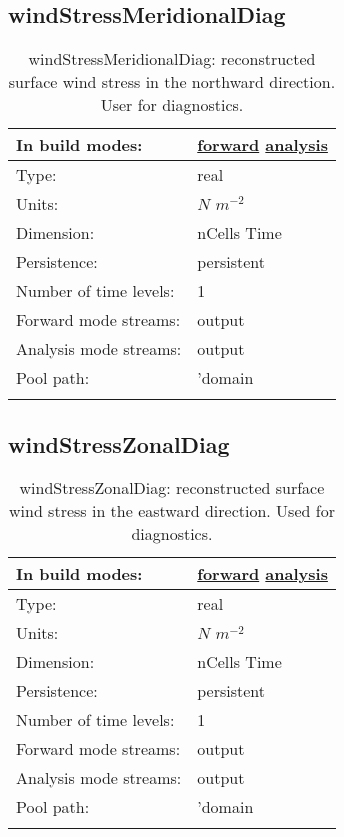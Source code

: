 \subsection[windStressMeridionalDiag]{windStressMeridionalDiag}
\label{subsec:var_sec_diagnostics_windStressMeridionalDiag}
\begin{center}
\begin{longtable}{| p{2.0in} | p{4.0in} |}
        \hline 
        In build modes: & \hyperref[subsec:forward_var_tab_diagnostics]{forward} \hyperref[subsec:analysis_var_tab_diagnostics]{analysis} \\
        \hline 
        Type: & real \\
        \hline 
        Units: & $N$ $m^{-2}$ \\
        \hline 
        Dimension: & nCells Time \\
        \hline 
        Persistence: & persistent \\
        \hline 
        Number of time levels: & 1 \\
        \hline 
		 Forward mode streams: &  output \\
        \hline 
		 Analysis mode streams: &  output \\
        \hline 
            Pool path: & 'domain %
 \\
		 \hline 
    \caption{windStressMeridionalDiag: reconstructed surface wind stress in the northward direction. User for diagnostics.}
\end{longtable}
\end{center}
\subsection[windStressZonalDiag]{windStressZonalDiag}
\label{subsec:var_sec_diagnostics_windStressZonalDiag}
\begin{center}
\begin{longtable}{| p{2.0in} | p{4.0in} |}
        \hline 
        In build modes: & \hyperref[subsec:forward_var_tab_diagnostics]{forward} \hyperref[subsec:analysis_var_tab_diagnostics]{analysis} \\
        \hline 
        Type: & real \\
        \hline 
        Units: & $N$ $m^{-2}$ \\
        \hline 
        Dimension: & nCells Time \\
        \hline 
        Persistence: & persistent \\
        \hline 
        Number of time levels: & 1 \\
        \hline 
		 Forward mode streams: &  output \\
        \hline 
		 Analysis mode streams: &  output \\
        \hline 
            Pool path: & 'domain %
 \\
		 \hline 
    \caption{windStressZonalDiag: reconstructed surface wind stress in the eastward direction. Used for diagnostics.}
\end{longtable}
\end{center}

